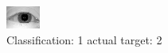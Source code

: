 \begin{figure}[h!]
\begin{center}
\includegraphics[width=0.60\columnwidth]{figures/ID867_class_1_target_2.png}
\end{center}
\caption{ Classification: 1 actual target: 2}
\label{fig:ID867_class_1_target_2}
\end{figure}
